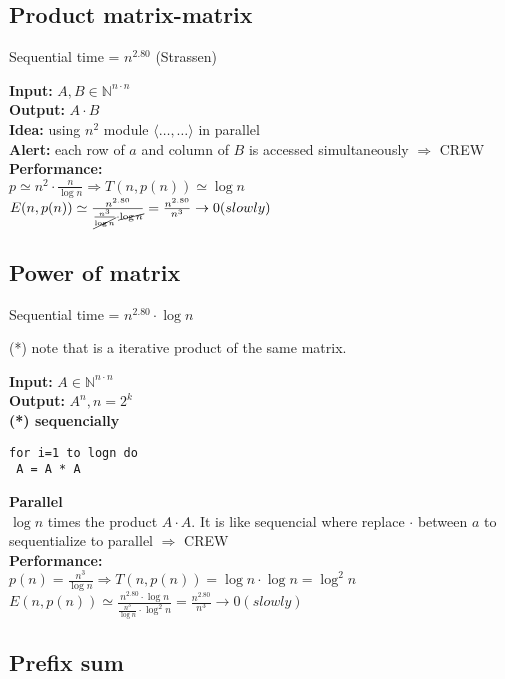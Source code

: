 \subsection{Product matrix-matrix}

Sequential time = $n^{2.80}$ (Strassen)

\textbf{Input:} $A,B \in \mathbb{N}^{n \cdot n}$\\
\textbf{Output:} $A \cdot B$\\
\textbf{Idea:} using $n^2$ module $\langle \dots,\dots \rangle$ in parallel\\
\textbf{Alert:} each row of $a$ and column of $B$ is accessed simultaneously $\Rightarrow$ CREW\\

\textbf{Performance:}\\
$p \simeq n^2 \cdot \frac{n}{\log{n}} \Rightarrow T(n, p(n)) \simeq \log{n}$\\
$E(n,p(n)) \simeq  \frac{n^{2.80}}{\frac{n^3}{\cancel{\log{n}}} \cdot \cancel{\log{n}}} = \frac{n^{2.80}}{n^3} \rightarrow 0 (slowly)$

\subsection{Power of matrix}

Sequential time = $n^{2.80} \cdot \log{n}$

(*) note that is a iterative product of the same matrix.

\textbf{Input:} $A \in \mathbb{N}^{n \cdot n}$\\
\textbf{Output:} $A^n, n = 2^k$\\
\textbf{(*) sequencially}
\begin{lstlisting}[]
for i=1 to logn do
 A = A * A
\end{lstlisting}
\textbf{Parallel}\\
$\log{n}$ times the product $A \cdot A$. It is like sequencial where replace $\cdot$ between $a$ to sequentialize to parallel $\Rightarrow$ CREW\\

\textbf{Performance:}\\
$p(n) = \frac{n^3}{\log{n}} \Rightarrow T(n, p(n)) = \log{n} \cdot \log{n} = \log^2{n}$\\
$E(n,p(n)) \simeq  \frac{n^{2.80} \cdot \log{n}}{\frac{n^3}{\log{n}} \cdot \log^2{n}} = \frac{n^{2.80}}{n^3} \rightarrow 0 (slowly)$

\subsection{Prefix sum}

